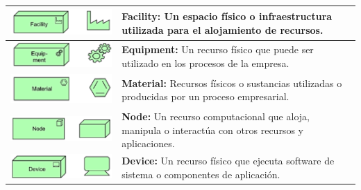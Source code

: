 \begin{longtable}{|c|p{8cm}|}
	\endlastfoot
	\includegraphics{anexos/ARCHI/technology/facility.png}      &
	\textbf{Facility:} Un espacio físico o infraestructura utilizada para el alojamiento de recursos.                                             \\
	\hline
	\includegraphics{anexos/ARCHI/technology/equipment.png}     &
	\textbf{Equipment:} Un recurso físico que puede ser utilizado en los procesos de la empresa.                                                  \\
	\hline
	\includegraphics{anexos/ARCHI/technology/material.png}      &
	\textbf{Material:} Recursos físicos o sustancias utilizadas o producidas por un proceso empresarial.                                          \\
	\hline
	\includegraphics{anexos/ARCHI/technology/node.png}          &
	\textbf{Node:} Un recurso computacional que aloja, manipula o interactúa con otros recursos y aplicaciones.                                   \\
	\hline
	\includegraphics{anexos/ARCHI/technology/device.png}        &
	\textbf{Device:} Un recurso físico que ejecuta software de sistema o componentes de aplicación.                                               \\

\end{longtable}
